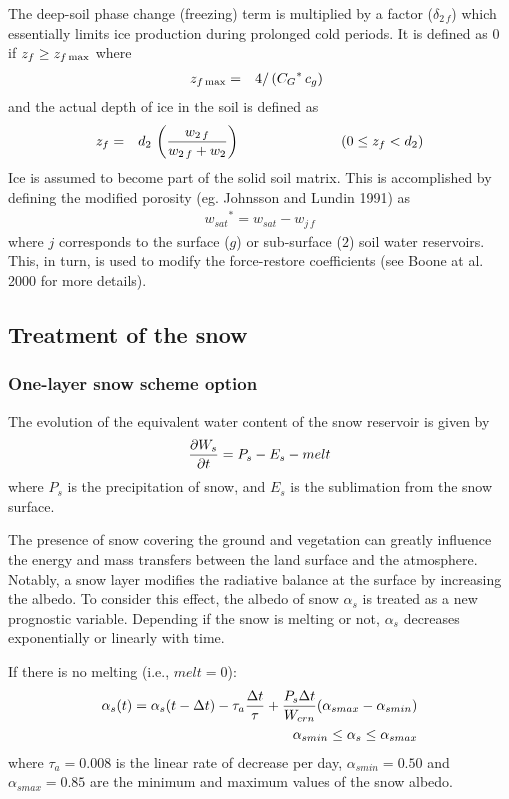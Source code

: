 The deep-soil phase change (freezing) term
is multiplied by a factor ($\delta_{2\,f}$)
which essentially limits ice production during prolonged
cold periods.  It is defined as 0 if $z_f \geq z_{f\,{\rm max}}$
where
%
\begin{eqnarray}
z_{f\,{\rm max}} &=& 4/\left( {C_G}^\ast\,c_g\right)
\,\,\,
\end{eqnarray}
and the actual depth of ice in the soil is defined as
\begin{eqnarray}
z_f &=& d_2 \, \left({w_{2\,f}\over w_{2\,f} + w_2}\right)
\hskip1.in \left(0 \leq z_f < d_2\right)
\end{eqnarray}
%
Ice is assumed to become
part of the solid soil matrix. This is accomplished by
defining the modified porosity
(eg. Johnsson and Lundin 1991) as
%
\begin{eqnarray}
{w_{sat}}^\ast = w_{sat} - w_{j\,f}
\end{eqnarray}
%
where $j$ corresponds to the surface ($g$) or sub-surface ($2$)
soil water reservoirs.
This, in turn, is used to modify the force-restore coefficients
(see Boone at al. 2000 for more details).

\subsection{Treatment of the snow}

\subsubsection{One-layer snow scheme option}

The evolution of the equivalent water content of the snow reservoir
is given by
\begin{eqnarray}
{\partial W_s \over \partial t} = P_s - E_s - melt
\end{eqnarray}
where $P_s$ is the precipitation of snow, and $E_s$ is the sublimation
from the snow surface.

The presence of snow covering the ground and
vegetation can greatly influence the energy and mass
transfers between the land surface and the atmosphere.
Notably, a snow layer modifies the radiative
balance at the surface by increasing the albedo.
To consider this effect, the albedo of snow $\alpha_s$ is treated
as a new prognostic variable.
Depending if the snow is melting or not,
$\alpha_s$ decreases
exponentially or linearly with time.

If there is no melting (i.e., $melt=0$):
\begin{eqnarray}
\alpha_s (t) = \alpha_s (t-\Delta t) - \tau_a {\Delta t \over \tau}
+ { P_s \Delta t \over W_{crn} } ( \alpha_{smax} - \alpha_{smin} ) \\
\alpha_{smin} \leq \alpha_s \leq \alpha_{smax}
\end{eqnarray}
where $\tau_a=0.008$ is the linear rate of decrease per day,
$\alpha_{smin}=0.50$
and $\alpha_{smax}=0.85$ are the minimum and maximum values of the snow
albedo.

